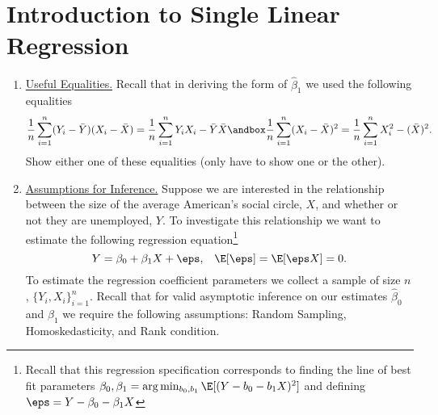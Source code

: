 \documentclass[10pt]{article}
\begin{document}
\section*{Introduction to Single Linear Regression}%
\begin{enumerate}
	\item \underline{Useful Equalities.}  Recall that in deriving the form of \(\hat\beta_1\) we used the following equalities
	\[
		\frac{1}{n}\sum_{i=1}^n (Y_i - \bar Y)(X_i - \bar X) = \frac{1}{n}\sum_{i=1}^n Y_iX_i - \bar Y \bar X \andbox \frac{1}{n}\sum_{i=1}^n (X_i - \bar X)^2 = \frac{1}{n}\sum_{i=1}^n  X_i^2 - (\bar X)^2
	.\] 
	Show either one of these equalities (only have to show one or the other).

	 
	\item \underline{Assumptions for Inference.} Suppose we are interested in the relationship between the size of the average American's social circle, \(X\), and whether or not they are unemployed, \(Y\). To investigate this relationship we want to estimate the following regression equation\footnote{Recall that this regression specification corresponds to finding the line of best fit parameters \(\beta_0, \beta_1 = \arg\min_{b_0,b_1}\E[(Y-b_0-b_1X)^2]\) and defining \(\eps = Y -\beta_0 - \beta_1X\)}
	\[
		Y = \beta_0 + \beta_1X + \eps,\;\;\; \E[\eps] = \E[\eps X] = 0
	.\] 
	To estimate the regression coefficient parameters we collect a sample of size \(n\), \(\{Y_i,X_i\}_{i=1}^{n}\). Recall that for valid asymptotic inference on our estimates \(\hat\beta_0\) and \(\hat\beta_1\) we require the following assumptions: Random Sampling, Homoskedasticity, and Rank condition.

\end{enumerate}
\end{document}
